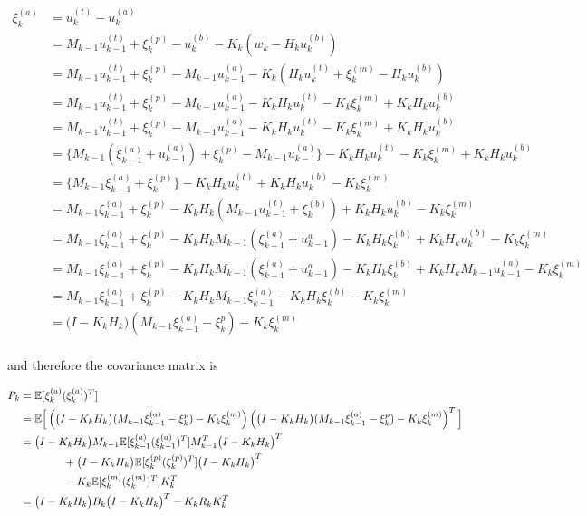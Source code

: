 \begin{align}
	\xi_k^{(a)} &= u_k^{(t)} - u_k^{(a)} \\
                &= M_{k-1}u_{k-1}^{(t)} + \xi_{k}^{(p)} - u_k^{(b)} - K_k\left(w_k - H_ku_k^{(b)} \right) \\
                &= M_{k-1}u_{k-1}^{(t)} + \xi_{k}^{(p)} - M_{k-1}u_{k-1}^{(a)} - K_k\left(H_ku_k^{(t)} + \xi_k^{(m)} - H_ku_k^{(b)} \right) \\
                &= M_{k-1}u_{k-1}^{(t)} + \xi_{k}^{(p)} - M_{k-1}u_{k-1}^{(a)} - K_kH_ku_k^{(t)} - K_k\xi_k^{(m)} + K_kH_ku_k^{(b)} \\
                &= M_{k-1}u_{k-1}^{(t)} + \xi_{k}^{(p)} - M_{k-1}u_{k-1}^{(a)} - K_kH_ku_k^{(t)} - K_k\xi_k^{(m)} + K_kH_ku_k^{(b)} \\
                &= \Big\{ M_{k-1}(\xi_{k-1}^{(a)}+u_{k-1}^{(a)}) + \xi_{k}^{(p)} - M_{k-1}u_{k-1}^{(a)} \Big\} - K_kH_ku_k^{(t)} - K_k\xi_k^{(m)} + K_kH_ku_k^{(b)} \\
                &= \Big\{ M_{k-1}\xi_{k-1}^{(a)} + \xi_{k}^{(p)} \Big\} - K_kH_ku_k^{(t)} + K_kH_ku_k^{(b)} - K_k\xi_k^{(m)}\\
                &= M_{k-1}\xi_{k-1}^{(a)} + \xi_{k}^{(p)} - K_kH_k(M_{k-1}u_{k-1}^{(t)} + \xi_k^{(b)}) + K_kH_ku_k^{(b)} - K_k\xi_k^{(m)}\\
                &= M_{k-1}\xi_{k-1}^{(a)} + \xi_{k}^{(p)} - K_kH_kM_{k-1}(\xi_{k-1}^{(a)} + u_{k-1}^a) - K_kH_k\xi_k^{(b)} + K_kH_ku_k^{(b)} - K_k\xi_k^{(m)}\\
                &= M_{k-1}\xi_{k-1}^{(a)} + \xi_{k}^{(p)} - K_kH_kM_{k-1}(\xi_{k-1}^{(a)} + u_{k-1}^a) - K_kH_k\xi_k^{(b)} + K_kH_kM_{k-1}u_{k-1}^{(a)} - K_k\xi_k^{(m)}\\
                &= M_{k-1}\xi_{k-1}^{(a)} + \xi_{k}^{(p)} - K_kH_kM_{k-1}\xi_{k-1}^{(a)} - K_kH_k\xi_k^{(b)} - K_k\xi_k^{(m)}\\
                &= \big(I-K_kH_k \big)(M_{k-1}\xi_{k-1}^{(a)} - \xi_{k}^p) - K_k\xi_k^{(m)}\\
\end{align}

and therefore the covariance matrix is

\begin{align}
    P_k &= \mathbb{E}[\xi_{k}^{(a)}(\xi_{k}^{(a)})^T] \\
        &= \mathbb{E}\Big[\left(\big(I-K_kH_k \big)(M_{k-1}\xi_{k-1}^{(a)} - \xi_{k}^p) - K_k\xi_k^{(m)} \right) \left(\big(I-K_kH_k \big)(M_{k-1}\xi_{k-1}^{(a)} - \xi_{k}^p) - K_k\xi_k^{(m)} \right)^T \Big] \\
        &= \big(I-K_kH_k \big)M_{k-1}\mathbb{E}[\xi_{k-1}^{(a)}(\xi_{k-1}^{(a)})^T]M_{k-1}^T\big(I-K_kH_k \big)^T \\
        &\qquad \qquad + \big(I-K_kH_k \big)\mathbb{E}[\xi_k^{(p)}(\xi_k^{(p)})^T]\big(I-K_kH_k \big)^T \notag\\
        & \qquad \qquad - K_k\mathbb{E}[\xi_{k}^{(m)}(\xi_k^{(m)})^T]K_k^T \notag\\
        &= \big(I-K_kH_k \big)B_k\big(I-K_kH_k \big)^T - K_kR_kK_k^T
\end{align}

